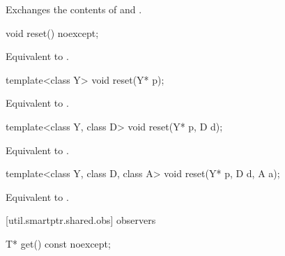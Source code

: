 \begin{itemdescr}

\pnum\effects  Exchanges the contents of  and .
\end{itemdescr}

%
%
\begin{itemdecl}
void reset() noexcept;
\end{itemdecl}

\begin{itemdescr}
\pnum\effects  Equivalent to .
\end{itemdescr}

%
%
\begin{itemdecl}
template<class Y> void reset(Y* p);
\end{itemdecl}

\begin{itemdescr}
\pnum\effects  Equivalent to .
\end{itemdescr}

%
%
\begin{itemdecl}
template<class Y, class D> void reset(Y* p, D d);
\end{itemdecl}

\begin{itemdescr}
\pnum\effects  Equivalent to .
\end{itemdescr}

%
%
\begin{itemdecl}
template<class Y, class D, class A> void reset(Y* p, D d, A a);
\end{itemdecl}

\begin{itemdescr}
\pnum
\effects  Equivalent to .
\end{itemdescr}

[util.smartptr.shared.obs]{ observers}
%
%
\begin{itemdecl}
T* get() const noexcept;
\end{itemdecl}

